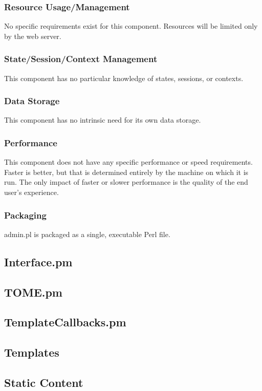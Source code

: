 \documentclass[12pt,titlepage]{article}
\begin{document}
\subsubsection{Resource Usage/Management}
No specific requirements exist for this component.  Resources will be limited only by the web server.
\subsubsection{State/Session/Context Management}
This component has no particular knowledge of states, sessions, or contexts.
\subsubsection{Data Storage}
This component has no intrinsic need for its own data storage.
\subsubsection{Performance}
This component does not have any specific performance or speed requirements.  Faster is better, but that is determined entirely by the machine on which it is run.  The only impact of faster or slower performance is the quality of the end user's experience.
\subsubsection{Packaging}
admin.pl is packaged as a single, executable Perl file.
\subsection{Interface.pm}
\subsection{TOME.pm}
\subsection{TemplateCallbacks.pm}
\subsection{Templates}
\subsection{Static Content}
\end{document}
